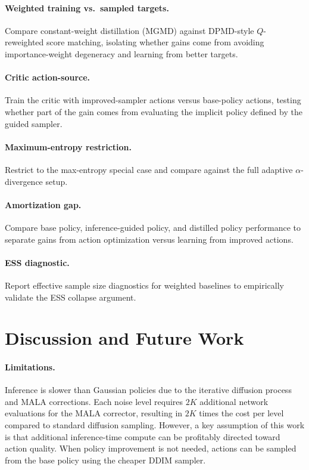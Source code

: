 \documentclass{article}
\theoremstyle{plain}
\theoremstyle{definition}
\theoremstyle{remark}
\begin{document}
\paragraph{Weighted training vs.\ sampled targets.}
Compare constant-weight distillation (MGMD) against DPMD-style $Q$-reweighted score matching, isolating whether gains come from avoiding importance-weight degeneracy and learning from better targets.

\paragraph{Critic action-source.}
Train the critic with improved-sampler actions versus base-policy actions, testing whether part of the gain comes from evaluating the implicit policy defined by the guided sampler.

\paragraph{Maximum-entropy restriction.}
Restrict to the max-entropy special case and compare against the full adaptive $\alpha$-divergence setup.

\paragraph{Amortization gap.}
Compare base policy, inference-guided policy, and distilled policy performance to separate gains from action optimization versus learning from improved actions.

\paragraph{ESS diagnostic.}
Report effective sample size diagnostics for weighted baselines to empirically validate the ESS collapse argument.

\section{Discussion and Future Work}
\label{sec:discussion}

\paragraph{Limitations.}
Inference is slower than Gaussian policies due to the iterative diffusion process and MALA corrections.
Each noise level requires $2K$ additional network evaluations for the MALA corrector, resulting in $2K$ times the cost per level compared to standard diffusion sampling.
However, a key assumption of this work is that additional inference-time compute can be profitably directed toward action quality.
When policy improvement is not needed, actions can be sampled from the base policy using the cheaper DDIM sampler.
\end{document}
